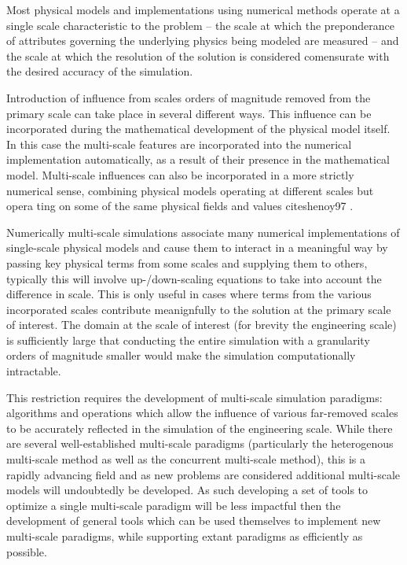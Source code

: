 Most physical models and implementations using numerical methods operate at a single scale characteristic to the problem -- the scale at which the preponderance of attributes governing the underlying physics being modeled are measured -- and the scale at which the resolution of the solution is considered comensurate with the desired accuracy of the simulation.

Introduction of influence from scales orders of magnitude removed from the primary scale can take place in several different ways. This influence can be incorporated during the mathematical development of the physical model itself. In this case the multi-scale features are incorporated into the numerical implementation automatically, as a result of their presence in the mathematical model. Multi-scale influences can also be incorporated in a more strictly numerical sense, combining physical models operating at different scales but opera ting on some of the same physical fields and values cite{shenoy97} \cite{weinan2003heterogenous}. 

Numerically multi-scale simulations associate many numerical implementations of single-scale physical models and cause them to interact in a meaningful way by passing key physical terms from some scales and supplying them to others, typically this will involve up-/down-scaling equations to take into account the difference in scale. This is only useful in cases where terms from the various incorporated scales contribute meanignfully to the solution at the primary scale of interest. The domain at the scale of interest (for brevity the engineering scale) is sufficiently large that conducting the entire simulation with a granularity orders of magnitude smaller would make the simulation computationally intractable. 

This restriction requires the development of multi-scale simulation paradigms: algorithms and operations which allow the influence of various far-removed scales to be accurately reflected in the simulation of the engineering scale. While there are several well-established multi-scale paradigms (particularly the heterogenous multi-scale method as well as the concurrent multi-scale method), this is a rapidly advancing field and as new problems are considered additional multi-scale models will undoubtedly be developed. As such developing a set of tools to optimize a single multi-scale paradigm will be less impactful then the development of general tools which can be used themselves to implement new multi-scale paradigms, while supporting extant paradigms as efficiently as possible.

